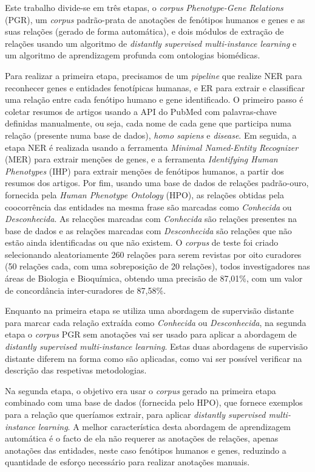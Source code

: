Este trabalho divide-se em três etapas, o \textit{corpus} \textit{Phenotype-Gene Relations} (PGR), um \textit{corpus} padrão-prata de anotações de fenótipos humanos e genes e as suas relações (gerado de forma automática), e dois módulos de extração de relações usando um algoritmo de \textit{distantly supervised multi-instance learning} e um algoritmo de aprendizagem profunda com ontologias biomédicas.

Para realizar a primeira etapa, precisamos de um \textit{pipeline} que realize NER para reconhecer genes e entidades fenotípicas humanas, e ER para extrair e classificar uma relação entre cada fenótipo humano e gene identificado. O primeiro passo é coletar resumos de artigos usando a API do PubMed com palavras-chave definidas manualmente, ou seja, cada nome de cada gene que participa numa relação (presente numa base de dados), \textit{homo sapiens} e \textit{disease}. Em seguida, a etapa NER é realizada usando a ferramenta \textit{Minimal Named-Entity Recognizer} (MER) para extrair menções de genes, e a ferramenta \textit{Identifying Human Phenotypes} (IHP) para extrair menções de fenótipos humanos, a partir dos resumos dos artigos. Por fim, usando uma base de dados de relações padrão-ouro, fornecida pela \textit{Human Phenotype Ontology} (HPO), as relações obtidas pela coocorrência das entidades na mesma frase são marcadas como \textit{Conhecida} ou \textit{Desconhecida}. As relacções marcadas com \textit{Conhecida} são relações presentes na base de dados e as relações marcadas com \textit{Desconhecida} são relações que não estão ainda identificadas ou que não existem.
O \textit{corpus} de teste foi criado selecionando aleatoriamente 260 relações para serem revistas por oito curadores (50 relações cada, com uma sobreposição de 20 relações), todos investigadores nas áreas de Biologia e Bioquímica, obtendo uma precisão de 87,01\%, com um valor de concordância inter-curadores de 87,58\%.

Enquanto na primeira etapa se utiliza uma abordagem de supervisão distante para marcar cada relação extraída como \textit{Conhecida} ou \textit{Desconhecida}, na segunda etapa o \textit{corpus} PGR sem anotações vai ser usado para aplicar a abordagem de \textit{distantly supervised multi-instance learning}. Estas duas abordagens de supervisão distante diferem na forma como são aplicadas, como vai ser possível verificar na descrição das respetivas metodologias. 

Na segunda etapa, o objetivo era usar o \textit{corpus} gerado na primeira etapa combinado com uma base de dados (fornecida pelo HPO), que fornece exemplos para a relação que queríamos extrair, para aplicar \textit{distantly supervised multi-instance learning}. A melhor característica desta abordagem de aprendizagem automática é o facto de ela não requerer as anotações de relações, apenas anotações das entidades, neste caso fenótipos humanos e genes, reduzindo a quantidade de esforço necessário para realizar anotações manuais.

